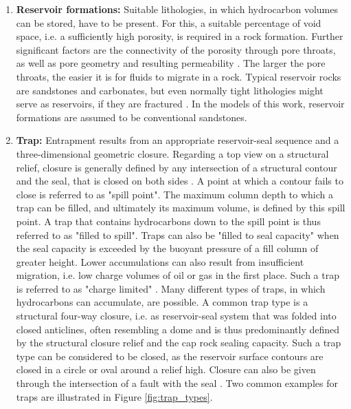 \begin{enumerate}
        	\item \textbf{Reservoir formations:} Suitable lithologies, in which hydrocarbon volumes can be stored, have to be present. For this, a suitable percentage of void space, i.e. a sufficiently high porosity, is required in a rock formation. Further significant factors are the connectivity of the porosity through pore throats, as well as pore geometry and resulting permeability \citep{dolson2016basics, sorkhabi2005place}. The larger the pore throats, the easier it is for fluids to migrate in a rock. Typical reservoir rocks are sandstones and carbonates, but even normally tight lithologies might serve as reservoirs, if they are fractured \citep{dolson2016basics}. In the models of this work, reservoir formations are assumed to be conventional sandstones.
        	\item \textbf{Trap:} Entrapment results from an appropriate reservoir-seal sequence and a three-dimensional geometric closure. Regarding a top view on a structural relief, closure is generally defined by any intersection of a structural contour and the seal, that is closed on both sides \citep{dolson2016basics, sorkhabi2005place}. A point at which a contour fails to close is referred to as "spill point". The maximum column depth to which a trap can be filled, and ultimately its maximum volume, is defined by this spill point. A trap that contains hydrocarbons down to the spill point is thus referred to as "filled to spill". Traps can also be "filled to seal capacity" when the seal capacity is exceeded by the buoyant pressure of a fill column of greater height. Lower accumulations can also result from insufficient migration, i.e. low charge volumes of oil or gas in the first place. Such a trap is referred to as "charge limited" \citep{dolson2016basics}. Many different types of traps, in which hydrocarbons can accumulate, are possible. A common trap type is a structural four-way closure, i.e. as reservoir-seal system that was folded into closed anticlines, often resembling a dome and is thus predominantly defined by the structural closure relief and the cap rock sealing capacity. Such a trap type can be considered to be closed, as the reservoir surface contours are closed in a circle or oval around a relief high. Closure can also be given through the intersection of a fault with the seal \citep{dolson2016basics}. Two common examples for traps are illustrated in Figure \ref{fig:trap_types}.
        \end{enumerate}
